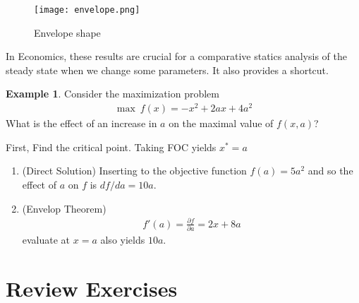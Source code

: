 \documentclass[10pt,a4paper]{book}
\theoremstyle{definition}\newtheorem{definition}{Definition}
\theoremstyle{definition}\newtheorem{fact}{Fact}
\theoremstyle{definition}\newtheorem{ex}{Ex.}
\theoremstyle{definition}\newtheorem{project}{Project}
\theoremstyle{definition}\newtheorem{problem}{Problem}
\theoremstyle{definition}\newtheorem{example}{Example}
\numberwithin{theorem}{chapter}
\numberwithin{corollary}{chapter}
\numberwithin{assumption}{chapter}
\numberwithin{definition}{chapter}
\numberwithin{prop}{chapter}
\numberwithin{notation}{chapter}
\numberwithin{problem}{chapter}
\numberwithin{example}{chapter}
\numberwithin{fact}{chapter}
\numberwithin{ex}{chapter}
\begin{document}
	\begin{figure}[ht]
		\centering
		\texttt{[image: envelope.png]}
		\caption{Envelope shape}
	\end{figure}
	
	In Economics, these results are crucial for a comparative statics analysis of the steady state when we change some parameters. It also provides a shortcut.
	
	\begin{example}
		Consider the maximization problem
		\begin{align*}
			\max \ f(x) = - x^2 + 2ax + 4 a^2 
		\end{align*}
		What is the effect of an increase in $a$ on the maximal value of $f(x,a)$?
		
		First, Find the critical point. Taking FOC yields $x^* = a$
		\begin{enumerate}
			\item (Direct Solution) Inserting to the objective function $f(a) = 5 a^2$ and so the effect of $a$ on $f$ is $df/da = 10a$. \\
			\item (Envelop Theorem) 
			\begin{align*}
				f'(a) = \frac{\partial f}{\partial a} = 2x + 8a 
			\end{align*}
			evaluate at $x=a$ also yields $10a$.
		\end{enumerate}
	\end{example}
	
	\section{Review Exercises}
	
\end{document}
